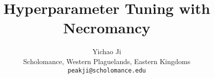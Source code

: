 \documentclass[11pt,a4paper]{article}
\title{Hyperparameter Tuning with Necromancy}
\author{Yichao Ji\\
    Scholomance, Western Plaguelands, Eastern Kingdoms\\
    \texttt{peakji@scholomance.edu}
}
\date{}
\begin{document}
\maketitle

\begin{abstract}
    
\end{abstract}










\appendix


\end{document}
